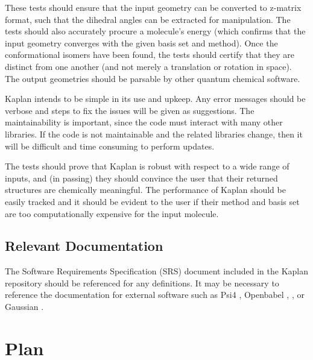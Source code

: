 \documentclass[12pt, titlepage]{article}
\newcommand{\progname}{Kaplan} %
\begin{document}
These tests should ensure that the input geometry can be converted to z-matrix 
format, such that the dihedral angles can be extracted for manipulation. The 
tests should also accurately procure a molecule's energy (which confirms that 
the input geometry converges with the given basis set and method). Once the 
conformational isomers have been found, the tests should certify that they are 
distinct from one another (and not merely a translation or rotation in space). 
The output geometries should be parsable by other quantum chemical software.

\progname{} intends to be simple in its use and upkeep. Any error messages 
should be verbose and steps to fix the issues will be given as suggestions. The 
maintainability is important, since the code must interact with many other 
libraries. If the code is not maintainable and the related libraries change, 
then it will be difficult and time consuming to perform updates. 

The tests should prove that \progname{} is robust with respect to a wide range 
of inputs, and (in passing) they should convince the user that their returned 
structures are chemically meaningful. The performance of \progname{} should be 
easily tracked and it should be evident to the user if their method and basis 
set are too computationally expensive for the input molecule.


\subsection{Relevant Documentation}

The Software Requirements Specification (SRS) document included in the 
\progname{} repository should be referenced for any definitions. It may be 
necessary to reference the documentation for external software such as Psi4 
\cite{psi4}, Openbabel \cite{obabel}, \cite{obabel-web}, or Gaussian \cite{g16}.


\section{Plan} \label{section-plans}
	
\end{document}
